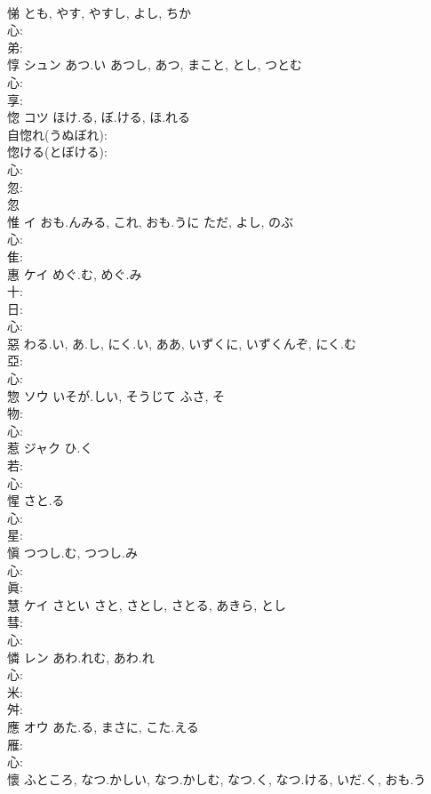 \documentclass[8pt]{extreport}
\begin{document}
\begin{CJK}{UTF8}{min}
\\	悌			とも, やす, やすし, よし, ちか			
\\	心: 
\\	弟: 
\\	惇	シュン	あつ.い	あつし, あつ, まこと, とし, つとむ	
\\	心: 
\\	享: 
\\	惚	コツ	ほけ.る, ぼ.ける, ほ.れる		
\\	自惚れ(うぬぼれ): 
\\	惚ける(とぼける): 
\\	心: 
\\	忽: 
\\	忽 
\\	惟	イ	おも.んみる, これ, おも.うに	ただ, よし, のぶ	
\\	心: 
\\	隹: 
\\	惠	ケイ	めぐ.む, めぐ.み		
\\	十: 
\\	日: 
\\	心: 
\\	惡		わる.い, あ.し, にく.い, ああ, いずくに, いずくんぞ, にく.む				
\\	亞: 
\\	心: 
\\	惣	ソウ	いそが.しい, そうじて	ふさ, そ	
\\	物: 
\\	心: 
\\	惹	ジャク	ひ.く		
\\	若: 
\\	心: 
\\	惺		さと.る				
\\	心: 
\\	星: 
\\	愼		つつし.む, つつし.み				
\\	心: 
\\	眞: 
\\	慧	ケイ	さとい	さと, さとし, さとる, あきら, とし	
\\	彗: 
\\	心: 
\\	憐	レン	あわ.れむ, あわ.れ		
\\	心: 
\\	米: 
\\	舛: 
\\	應	オウ	あた.る, まさに, こた.える		
\\	雁: 
\\	心: 
\\	懷		ふところ, なつ.かしい, なつ.かしむ, なつ.く, なつ.ける, いだ.く, おも.う				

\end{CJK}
\end{document}
